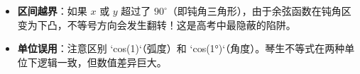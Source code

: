 \begin{trapbox}
\begin{itemize}
    \item \textbf{区间越界}：如果 $x$ 或 $y$ 超过了 $90^\circ$（即钝角三角形），由于余弦函数在钝角区变为下凸，不等号方向会发生翻转！这是高考中最隐蔽的陷阱。
    \item \textbf{单位误用}：注意区别 `cos(1)`（弧度）和 `cos(1°)`（角度）。琴生不等式在两种单位下逻辑一致，但数值差异巨大。
\end{itemize}
\end{trapbox}